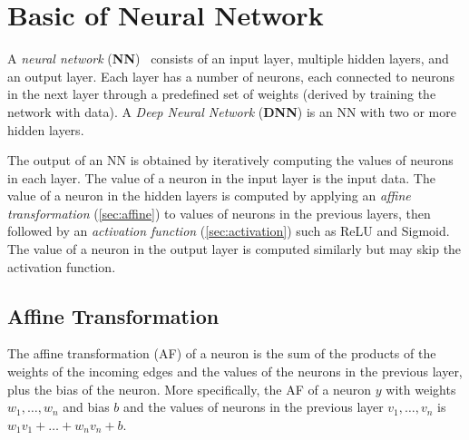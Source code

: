 \documentclass[oneside,11pt,dvipsnames]{book}
\begin{document}
\chapter{Basic of Neural Network}\label{sec:basic}

A \emph{neural network} (\textbf{NN})~\cite{Goodfellow-et-al-2016} consists of an input layer, multiple hidden layers, and an output layer. Each layer has a number of neurons, each connected to neurons in the next layer through a predefined set of weights (derived by training the network with data). A \emph{Deep Neural Network} (\textbf{DNN}) is an NN with two or more hidden layers. 


The output of an NN is obtained by iteratively computing  the  values  of  neurons  in  each  layer.
The value of a neuron in the input layer is the input data. The value of a neuron in the hidden layers is computed by applying an \emph{affine transformation} (\autoref{sec:affine}) to values of neurons in the previous layers, then followed by an \emph{activation function} (\autoref{sec:activation}) such as ReLU and Sigmoid. The value of a neuron in the output layer is computed similarly but may skip the activation function.



\section{Affine Transformation}\label{sec:affine}
The affine transformation (AF) of a neuron is the sum of the products of the weights of the incoming edges and the values of the neurons in the previous layer, plus the bias of the neuron.
More specifically, the AF of a neuron \(y\) with weights \(w_1, \dots, w_n\) and bias \(b\) and the values of neurons in the previous layer \(v_1, \dots, v_n\) is \(w_1v_1 + \dots + w_nv_n + b\). 
\end{document}
